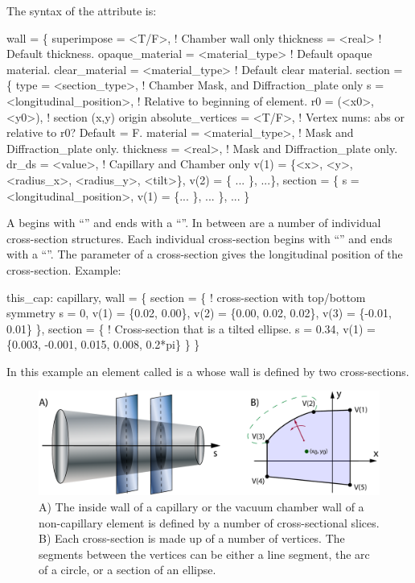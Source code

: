 The syntax of the  attribute is:
\begin{example}
  wall = \{
    superimpose = <T/F>,               ! Chamber wall only
    thickness = <real>                 ! Default thickness. 
    opaque_material = <material_type>  ! Default opaque material. 
    clear_material = <material_type>   ! Default clear material. 
    section = \{ 
      type = <section_type>,           ! Chamber Mask, and Diffraction_plate only
      s = <longitudinal_position>,     ! Relative to beginning of element.
      r0 = (<x0>, <y0>),               ! section (x,y) origin
      absolute_vertices = <T/F>,       ! Vertex nums: abs or relative to r0? Default = F.
      material = <material_type>,      ! Mask and Diffraction_plate only.
      thickness = <real>,              ! Mask and Diffraction_plate only.
      dr_ds = <value>,                 ! Capillary and Chamber only
      v(1) = \{<x>, <y>, <radius_x>, <radius_y>, <tilt>\}, 
      v(2) = \{ ... \},
      ...\},
    section = \{
      s = <longitudinal_position>, 
      v(1) = \{... \},
      ... \},
    ... \}
\end{example}
A  begins with ``'' and ends with a ``\vn{\}}''. In between are a number of
individual cross-section structures. Each individual cross-section begins with ``''
and ends with a ``\vn{\}}''. The  parameter of a cross-section gives the longitudinal position
of the cross-section.  Example:
\begin{example}
  this_cap: capillary, 
    wall = \{   
      section = \{ ! cross-section with top/bottom symmetry
        s = 0, v(1) =  \{0.02, 0.00\}, 
        v(2) = \{0.00, 0.02, 0.02\}, v(3) = \{-0.01, 0.01\} \}, 
      section = \{  ! Cross-section that is a tilted ellipse.
        s = 0.34, 
        v(1) = \{0.003, -0.001, 0.015, 0.008, 0.2*pi\} \} \}
\end{example}
In this example an element called  is a 
whose wall is defined by two cross-sections.


\begin{figure}[tb]
  \centering
  \includegraphics[width=6in]{chamber-wall.pdf}
  \caption[Capillary or vacuum chamber wall.]
{A) The inside wall of a capillary or the vacuum chamber wall of a non-capillary element is defined
by a number of cross-sectional slices.  B) Each cross-section is made up of a number of
vertices. The segments between the vertices can be either a line segment, the arc of a circle, or a
section of an ellipse.}
  \label{f:chamber.wall}
\end{figure}


